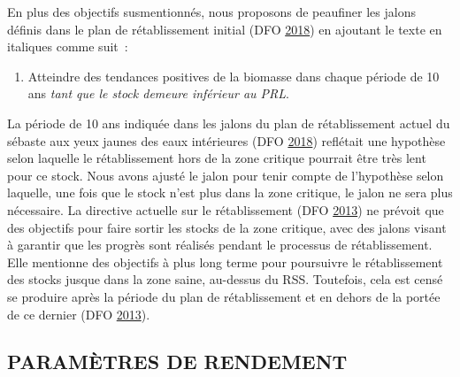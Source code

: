 \documentclass[11pt]{book}
\begin{document}
En plus des objectifs susmentionnés, nous proposons de peaufiner les jalons définis dans le plan de rétablissement initial (DFO \protect\hyperlink{ref-ifmp2018}{2018}) en ajoutant le texte en italiques comme suit~:
\begin{enumerate}
\def\labelenumi{\arabic{enumi}.}
\setcounter{enumi}{5}

\item
  Atteindre des tendances positives de la biomasse dans chaque période de 10 ans \emph{tant que le stock demeure inférieur au PRL}.
\end{enumerate}
La période de 10 ans indiquée dans les jalons du plan de rétablissement actuel du sébaste aux yeux jaunes des eaux intérieures (DFO \protect\hyperlink{ref-ifmp2018}{2018}) reflétait une hypothèse selon laquelle le rétablissement hors de la zone critique pourrait être très lent pour ce stock. Nous avons ajusté le jalon pour tenir compte de l'hypothèse selon laquelle, une fois que le stock n'est plus dans la zone critique, le jalon ne sera plus nécessaire. La directive actuelle sur le rétablissement (DFO \protect\hyperlink{ref-dfo2013}{2013}) ne prévoit que des objectifs pour faire sortir les stocks de la zone critique, avec des jalons visant à garantir que les progrès sont réalisés pendant le processus de rétablissement. Elle mentionne des objectifs à plus long terme pour poursuivre le rétablissement des stocks jusque dans la zone saine, au-dessus du RSS. Toutefois, cela est censé se produire après la période du plan de rétablissement et en dehors de la portée de ce dernier (DFO \protect\hyperlink{ref-dfo2013}{2013}).

\hypertarget{sec:objectives-metrics-pm}{%
\subsection{PARAMÈTRES DE RENDEMENT}\label{sec:objectives-metrics-pm}}
\end{document}
